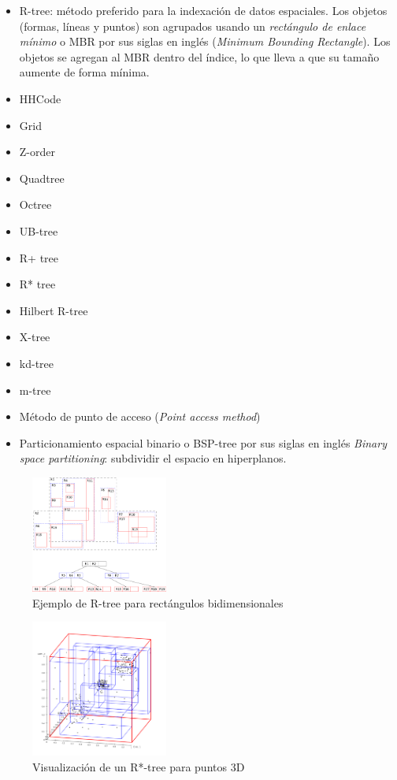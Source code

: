 \documentclass{article}
\begin{document}
\begin{itemize}
  \item R-tree: m\'etodo preferido para la indexaci\'on de datos espaciales. Los objetos (formas, l\'ineas y puntos) son agrupados usando un \emph{rect\'angulo de enlace m\'inimo} o MBR por sus siglas en ingl\'es (\emph{Minimum Bounding Rectangle}). Los objetos se agregan al MBR dentro del \'indice, lo que lleva a que su tama\~no aumente de forma m\'inima.
  \item HHCode
  \item Grid
  \item Z-order
  \item Quadtree
  \item Octree
  \item UB-tree
  \item R+ tree
  \item R* tree
  \item Hilbert R-tree
  \item X-tree
  \item kd-tree
  \item m-tree
  \item M\'etodo de punto de acceso (\emph{Point access method})
  \item Particionamiento espacial binario o BSP-tree por sus siglas en ingl\'es \emph{Binary space partitioning}: subdividir el espacio en hiperplanos.
\end{itemize}

\begin{figure}[!ht]
  \caption{Ejemplo de R-tree para rect\'angulos bidimensionales}
  \centering
    \includegraphics[width=0.4\textwidth]{r-tree.png}
\end{figure}

\begin{figure}[!ht]
  \caption{Visualizaci\'on de un R*-tree para puntos 3D}
  \centering
    \includegraphics[width=0.4\textwidth]{3d-r-tree.png}
\end{figure}
\end{document}
